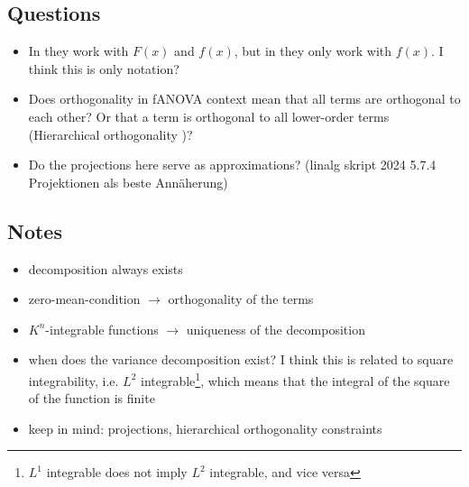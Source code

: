 \subsection*{Questions}
\begin{itemize}
    \item In \cite{hooker_discovering_2004} they work with $F(x)$ and $f(x)$, but in \cite{sobol_global_2001} they only work with $f(x)$. I think this is only notation?
    \item Does orthogonality in fANOVA context mean that all terms are orthogonal to each other? Or that a term is orthogonal to all lower-order terms (\ldq Hierarchical orthogonality \rdq)?
    \item Do the projections here serve as approximations? (linalg skript 2024 5.7.4 Projektionen als beste Annäherung)
\end{itemize}


\subsection*{Notes}
\begin{itemize}
    \item decomposition always exists
    \item zero-mean-condition $\rightarrow$ orthogonality of the terms
    \item $K^n$-integrable functions $\rightarrow$ uniqueness of the decomposition
    \item when does the variance decomposition exist? I think this is related to square integrability, i.e. $L^2$ integrable\footnote{$L^1$ integrable does not imply $L^2$ integrable, and vice versa}, which means that the integral of the square of the function is finite
    \item keep in mind: projections, hierarchical orthogonality constraints
\end{itemize}











